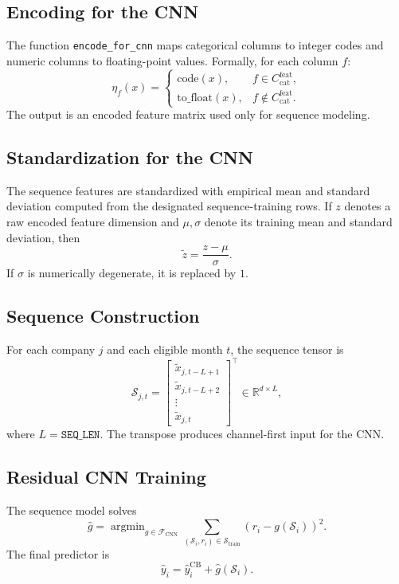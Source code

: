 \documentclass[11pt]{article}
\newcommand{\R}{\mathbb{R}}
\newcommand{\1}{\mathbf{1}}
\newcommand{\argmin}{\mathop{\mathrm{argmin}}}
\newcommand{\seq}{\mathcal{S}}
\begin{document}
\subsection{Encoding for the CNN}

The function \texttt{encode\_for\_cnn} maps categorical columns to integer codes and numeric columns to floating-point values. Formally, for each column $f$:
\[
\eta_f(x) =
\begin{cases}
\mathrm{code}(x), & f \in C_{\mathrm{cat}}^{\mathrm{feat}},\\
\mathrm{to\_float}(x), & f \notin C_{\mathrm{cat}}^{\mathrm{feat}}.
\end{cases}
\]
The output is an encoded feature matrix used only for sequence modeling.

\subsection{Standardization for the CNN}

The sequence features are standardized with empirical mean and standard deviation computed from the designated sequence-training rows. If $z$ denotes a raw encoded feature dimension and $\mu,\sigma$ denote its training mean and standard deviation, then
\[
\tilde z = \frac{z - \mu}{\sigma}.
\]
If $\sigma$ is numerically degenerate, it is replaced by $1$.

\subsection{Sequence Construction}

For each company $j$ and each eligible month $t$, the sequence tensor is
\[
\seq_{j,t} =
\begin{bmatrix}
\tilde x_{j,t-L+1} \\
\tilde x_{j,t-L+2} \\
\vdots \\
\tilde x_{j,t}
\end{bmatrix}^{\top}
\in \R^{d \times L},
\]
where $L = \texttt{SEQ\_LEN}$. The transpose produces channel-first input for the CNN.

\subsection{Residual CNN Training}

The sequence model solves
\[
\hat g = \argmin_{g \in \mathcal{F}_{\mathrm{CNN}}} \sum_{(\seq_i,r_i) \in \mathcal{S}_{\mathrm{train}}} (r_i - g(\seq_i))^2.
\]
The final predictor is
\[
\hat y_i = \hat y^{\mathrm{CB}}_i + \hat g(\seq_i).
\]
\end{document}
